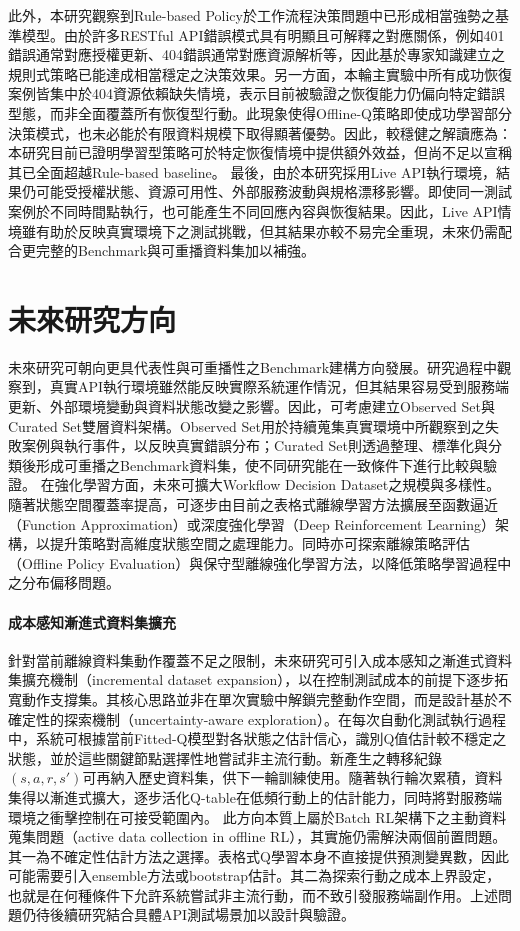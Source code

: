 \begin{ZhChapter}
\text 此外，本研究觀察到Rule-based Policy於工作流程決策問題中已形成相當強勢之基準模型。由於許多RESTful API錯誤模式具有明顯且可解釋之對應關係，例如401錯誤通常對應授權更新、404錯誤通常對應資源解析等，因此基於專家知識建立之規則式策略已能達成相當穩定之決策效果。另一方面，本輪主實驗中所有成功恢復案例皆集中於404資源依賴缺失情境，表示目前被驗證之恢復能力仍偏向特定錯誤型態，而非全面覆蓋所有恢復型行動。此現象使得Offline-Q策略即使成功學習部分決策模式，也未必能於有限資料規模下取得顯著優勢。因此，較穩健之解讀應為：本研究目前已證明學習型策略可於特定恢復情境中提供額外效益，但尚不足以宣稱其已全面超越Rule-based baseline。
\text 最後，由於本研究採用Live API執行環境，結果仍可能受授權狀態、資源可用性、外部服務波動與規格漂移影響。即使同一測試案例於不同時間點執行，也可能產生不同回應內容與恢復結果。因此，Live API情境雖有助於反映真實環境下之測試挑戰，但其結果亦較不易完全重現，未來仍需配合更完整的Benchmark與可重播資料集加以補強。


\section{未來研究方向}
\text 未來研究可朝向更具代表性與可重播性之Benchmark建構方向發展。研究過程中觀察到，真實API執行環境雖然能反映實際系統運作情況，但其結果容易受到服務端更新、外部環境變動與資料狀態改變之影響。因此，可考慮建立Observed Set與Curated Set雙層資料架構。Observed Set用於持續蒐集真實環境中所觀察到之失敗案例與執行事件，以反映真實錯誤分布；Curated Set則透過整理、標準化與分類後形成可重播之Benchmark資料集，使不同研究能在一致條件下進行比較與驗證。
\text 在強化學習方面，未來可擴大Workflow Decision Dataset之規模與多樣性。隨著狀態空間覆蓋率提高，可逐步由目前之表格式離線學習方法擴展至函數逼近（Function Approximation）或深度強化學習（Deep Reinforcement Learning）架構，以提升策略對高維度狀態空間之處理能力。同時亦可探索離線策略評估（Offline Policy Evaluation）與保守型離線強化學習方法，以降低策略學習過程中之分布偏移問題。

\paragraph{成本感知漸進式資料集擴充}
\text 針對當前離線資料集動作覆蓋不足之限制，未來研究可引入成本感知之漸進式資料集擴充機制（incremental dataset expansion），以在控制測試成本的前提下逐步拓寬動作支撐集。其核心思路並非在單次實驗中解鎖完整動作空間，而是設計基於不確定性的探索機制（uncertainty-aware exploration）。在每次自動化測試執行過程中，系統可根據當前Fitted-Q模型對各狀態之估計信心，識別Q值估計較不穩定之狀態，並於這些關鍵節點選擇性地嘗試非主流行動。新產生之轉移紀錄$(s, a, r, s')$可再納入歷史資料集，供下一輪訓練使用。隨著執行輪次累積，資料集得以漸進式擴大，逐步活化Q-table在低頻行動上的估計能力，同時將對服務端環境之衝擊控制在可接受範圍內。
\text 此方向本質上屬於Batch RL架構下之主動資料蒐集問題（active data collection in offline RL），其實施仍需解決兩個前置問題。其一為不確定性估計方法之選擇。表格式Q學習本身不直接提供預測變異數，因此可能需要引入ensemble方法或bootstrap估計。其二為探索行動之成本上界設定，也就是在何種條件下允許系統嘗試非主流行動，而不致引發服務端副作用。上述問題仍待後續研究結合具體API測試場景加以設計與驗證。


\end{ZhChapter}
